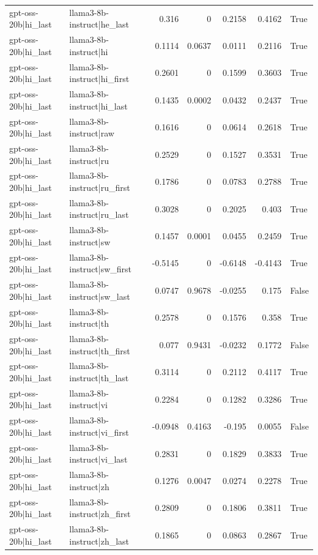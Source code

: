 \begin{table}
\begin{tabular}{l l r r r r l}
gpt-oss-20b|hi_last & llama3-8b-instruct|he_last & 0.316 & 0 & 0.2158 & 0.4162 & True \\
gpt-oss-20b|hi_last & llama3-8b-instruct|hi & 0.1114 & 0.0637 & 0.0111 & 0.2116 & True \\
gpt-oss-20b|hi_last & llama3-8b-instruct|hi_first & 0.2601 & 0 & 0.1599 & 0.3603 & True \\
gpt-oss-20b|hi_last & llama3-8b-instruct|hi_last & 0.1435 & 0.0002 & 0.0432 & 0.2437 & True \\
gpt-oss-20b|hi_last & llama3-8b-instruct|raw & 0.1616 & 0 & 0.0614 & 0.2618 & True \\
gpt-oss-20b|hi_last & llama3-8b-instruct|ru & 0.2529 & 0 & 0.1527 & 0.3531 & True \\
gpt-oss-20b|hi_last & llama3-8b-instruct|ru_first & 0.1786 & 0 & 0.0783 & 0.2788 & True \\
gpt-oss-20b|hi_last & llama3-8b-instruct|ru_last & 0.3028 & 0 & 0.2025 & 0.403 & True \\
gpt-oss-20b|hi_last & llama3-8b-instruct|sw & 0.1457 & 0.0001 & 0.0455 & 0.2459 & True \\
gpt-oss-20b|hi_last & llama3-8b-instruct|sw_first & -0.5145 & 0 & -0.6148 & -0.4143 & True \\
gpt-oss-20b|hi_last & llama3-8b-instruct|sw_last & 0.0747 & 0.9678 & -0.0255 & 0.175 & False \\
gpt-oss-20b|hi_last & llama3-8b-instruct|th & 0.2578 & 0 & 0.1576 & 0.358 & True \\
gpt-oss-20b|hi_last & llama3-8b-instruct|th_first & 0.077 & 0.9431 & -0.0232 & 0.1772 & False \\
gpt-oss-20b|hi_last & llama3-8b-instruct|th_last & 0.3114 & 0 & 0.2112 & 0.4117 & True \\
gpt-oss-20b|hi_last & llama3-8b-instruct|vi & 0.2284 & 0 & 0.1282 & 0.3286 & True \\
gpt-oss-20b|hi_last & llama3-8b-instruct|vi_first & -0.0948 & 0.4163 & -0.195 & 0.0055 & False \\
gpt-oss-20b|hi_last & llama3-8b-instruct|vi_last & 0.2831 & 0 & 0.1829 & 0.3833 & True \\
gpt-oss-20b|hi_last & llama3-8b-instruct|zh & 0.1276 & 0.0047 & 0.0274 & 0.2278 & True \\
gpt-oss-20b|hi_last & llama3-8b-instruct|zh_first & 0.2809 & 0 & 0.1806 & 0.3811 & True \\
gpt-oss-20b|hi_last & llama3-8b-instruct|zh_last & 0.1865 & 0 & 0.0863 & 0.2867 & True \\

\end{tabular}
\end{table}
